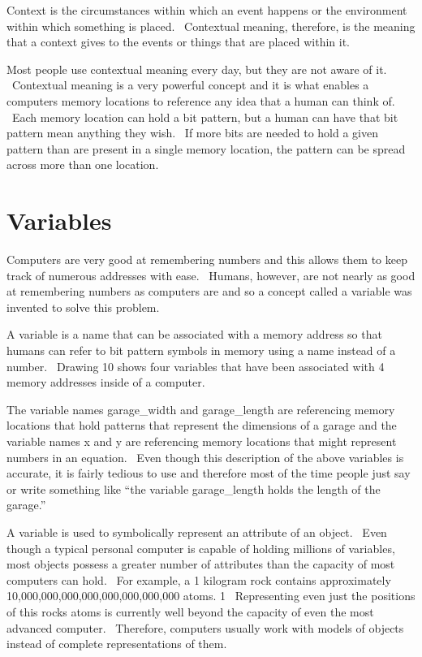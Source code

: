 \documentclass[12pt,twoside]{book}
\begin{document}
\bigskip

Context is the circumstances within which an event happens or the environment within which something is placed. \ Contextual meaning, therefore, is the meaning that a context gives to the events or things that are placed within it.


\bigskip

Most people use contextual meaning every day, but they are not aware of it. \ Contextual meaning is a very powerful concept and it is what enables a computer{\textquotesingle}s memory locations to reference any idea that a human can think of. \ Each memory location can hold a bit pattern, but a human can have that bit pattern mean anything they wish. \ If more bits are needed to hold a given pattern than are present in a single memory location, the pattern can be spread across more than one location.

\section[Variables]{Variables}

Computers are very good at remembering numbers and this allows them to keep track of numerous addresses with ease. \ Humans, however, are not nearly as good at remembering numbers as computers are and so a concept called a variable was invented to solve this problem. 

\bigskip

A variable is a name that can be associated with a memory address so that humans can refer to bit pattern symbols in memory using a name instead of a number. \ Drawing 10 shows four variables that have been associated with 4 memory addresses inside of a computer. 

\bigskip

The variable names garage\_width and garage\_length are referencing memory locations that hold patterns that represent the dimensions of a garage and the variable names x and y are referencing memory locations that might represent numbers in an equation. \ Even though this description of the above variables is accurate, it is fairly tedious to use and therefore most of the time people just say or write something like ``the variable garage\_length holds the length of the garage.'' 

\bigskip

A variable is used to symbolically represent an attribute of an object. \ Even though a typical personal computer is capable of holding millions of variables, most objects possess a greater number of attributes than the capacity of most computers can hold. \ For example, a 1 kilogram rock contains approximately 10,000,000,000,000,000,000,000,000 atoms. 1 \ Representing even just the positions of this rock{\textquotesingle}s atoms is currently well beyond the capacity of even the most advanced computer. \ Therefore, computers usually work with models of objects instead of complete representations of them.
\end{document}
